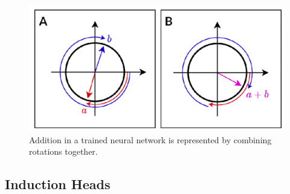 \begin{figure}[ht]
\centering
\includegraphics[scale=.4]{./images/toyModelAddition.png}
\caption[From \cite{nanda2023progress} .]{
      Addition in a trained neural network is represented by combining
      rotations together.
}
\label{toyModelAddition}
\end{figure}



\subsection{Induction Heads}

